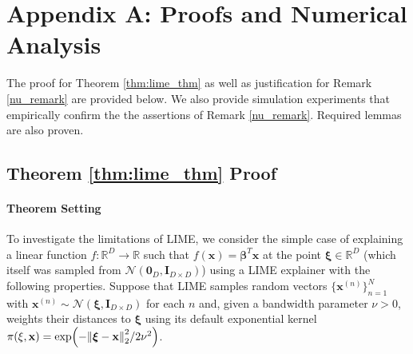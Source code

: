\documentclass[mnsc,blindrev]{informs3}
\newcommand{\bI}{\mathbf{I}}
\begin{document}
    \section*{Appendix A: Proofs and Numerical Analysis}  
        \label{apx_sec:proofs}    
        The proof for Theorem \ref{thm:lime_thm} as well as justification for Remark \ref{nu_remark} are provided below. We also provide simulation experiments that empirically confirm the the assertions of Remark \ref{nu_remark}. Required lemmas are also proven.
        
         \subsection{Theorem  
        \ref{thm:lime_thm} Proof}
        \paragraph{Theorem Setting}
        
            To investigate the limitations of LIME, we consider the simple case of explaining a linear function $f:\mathbb{R}^D \rightarrow \mathbb{R}$ such that $f(\mathbf{x}) = \boldsymbol{\beta}^T \mathbf{x}$ at the point $\boldsymbol{\xi}\in \mathbb{R}^D$ (which itself was sampled from $\mathcal{N}(\mathbf{0}_D, \bI_{D\times D})$) using a LIME explainer with the following properties. Suppose that LIME samples random vectors $\{\mathbf{x}^{(n)}\}_{n=1}^N$ with $\mathbf{x}^{(n)} \sim \mathcal{N}(\boldsymbol{\xi},\bI_{D\times D})$ for each $n$ and, given a bandwidth parameter $\nu > 0$, weights their distances to $\boldsymbol{\xi}$ using its default exponential kernel $\pi(\xi,\mathbf{x}) = \exp(-\norm{\boldsymbol{\xi} - \mathbf{x}}_2^2/2\nu^2)$. 
            
\end{document}
